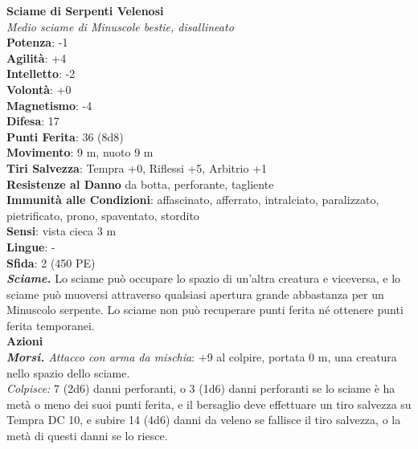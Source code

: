 \begin{multicols}{2}
\medskip\textbf{Sciame di Serpenti Velenosi}\\
\emph{Medio sciame di Minuscole bestie, disallineato}\\
\textbf{Potenza}: -1\\
\textbf{Agilità}: +4\\
\textbf{Intelletto}: -2\\
\textbf{Volontà}: +0\\
\textbf{Magnetismo}: -4\\
\textbf{Difesa}: 17\\
\textbf{Punti Ferita}: 36 (8d8)\\
\textbf{Movimento}: 9 m, nuoto 9 m\\
\textbf{Tiri Salvezza}: Tempra +0, Riflessi +5, Arbitrio +1\\
\textbf{Resistenze al Danno} da botta, perforante, tagliente\\
\textbf{Immunità alle Condizioni}: affascinato, afferrato, intralciato, paralizzato, pietrificato, prono, spaventato, stordito\\
\textbf{Sensi}: vista cieca 3 m\\
\textbf{Lingue}: -\\
\textbf{Sfida}: 2 (450 PE)\smallskip\\
\emph{\textbf{Sciame.}} Lo sciame può occupare lo spazio di un'altra creatura e viceversa, e lo sciame può muoversi attraverso qualsiasi apertura grande abbastanza per un Minuscolo serpente. Lo sciame non può recuperare punti ferita né ottenere punti ferita temporanei.\\
\smallskip\textbf{Azioni}\\
\emph{\textbf{Morsi.} Attacco con arma da mischia}: +9 al colpire, portata 0 m, una creatura nello spazio dello sciame.\\
\emph{Colpisce:} 7 (2d6) danni perforanti, o 3 (1d6) danni perforanti se lo sciame è ha metà o meno dei suoi punti ferita, e il bersaglio deve effettuare un tiro salvezza su Tempra DC 10, e subire 14 (4d6) danni da veleno se fallisce il tiro salvezza, o la metà di questi danni se lo riesce.\\


\end{multicols}
